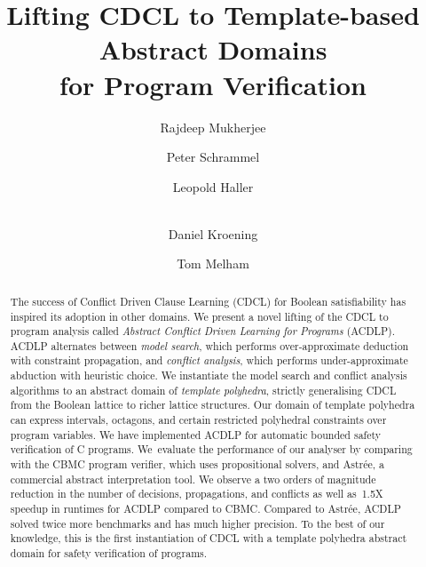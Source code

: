 \documentclass[a4paper]{llncs}
\begin{document}
\title{Lifting CDCL to Template-based Abstract Domains\\ for Program Verification}

\author{Rajdeep Mukherjee \and Peter Schrammel \and 
Leopold Haller \and \\ 
Daniel Kroening \and Tom Melham}


\maketitle

\begin{abstract}
%
The success of Conflict Driven Clause Learning (CDCL) for Boolean
satisfiability has inspired its adoption in other domains.  We present a
novel lifting of the CDCL to program analysis called \emph{Abstract Conflict
Driven Learning for Programs} (ACDLP).  ACDLP alternates between \emph{model
search}, which performs over-approximate deduction with constraint
propagation, and \emph{conflict analysis}, which performs under-approximate
abduction with heuristic choice.  We instantiate the model search and
conflict analysis algorithms to an abstract domain of \textit{template
polyhedra}, strictly generalising CDCL from the Boolean lattice to richer
lattice structures.  Our domain of template polyhedra can express intervals,
octagons, and certain restricted polyhedral constraints over program
variables.  We have implemented ACDLP for automatic bounded safety verification 
of C programs.  We~evaluate the performance of our
analyser by comparing with the CBMC program verifier, which uses
propositional solvers, and Astr{\'e}e, a commercial abstract
interpretation tool.  We observe a two orders of magnitude reduction in the
number of decisions, propagations, and conflicts as well as~1.5X speedup 
in runtimes for ACDLP compared to CBMC.  Compared to Astr{\'e}e, ACDLP solved 
twice more benchmarks and has much higher precision.  To the best of our 
knowledge, this is the first instantiation of CDCL with a template polyhedra 
abstract domain for safety verification of programs.
%
\end{abstract}


\end{document}

